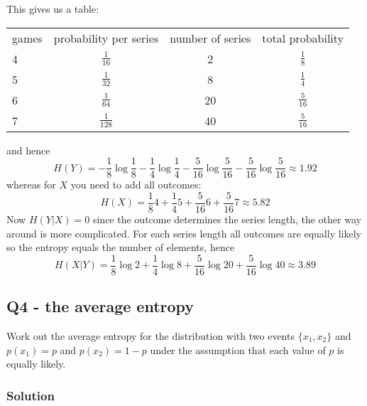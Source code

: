 \documentclass[12pt]{article}
\begin{document}
This gives us a table:
\begin{center}
  \begin{tabular}{l|ccc}
games&probability per series&number of series&total probability\\[7pt]
4& $\frac{1}{16}$  &2& $\frac{1}{8}$ \\[7pt]
5& $\frac{1}{32}$  &8& $\frac{1}{4}$ \\[7pt]
6& $\frac{1}{64}$  &20&$\frac{5}{16}$\\[7pt]
7& $\frac{1}{128}$ &40&$\frac{5}{16}$
  \end{tabular}
\end{center}
and hence
\begin{equation}
  H(Y)=-\frac{1}{8}\log{\frac{1}{8}}-\frac{1}{4}\log{\frac{1}{4}}-\frac{5}{16}\log{\frac{5}{16}}-\frac{5}{16}\log{\frac{5}{16}}\approx 1.92
\end{equation}
whereas for $X$ you need to add all outcomes: 
\begin{equation}
  H(X)=\frac{1}{8}4+\frac{1}{4}5+\frac{5}{16}6+\frac{5}{16}7\approx 5.82
\end{equation}
Now $H(Y|X)=0$ since the outcome determines the series length, the
other way around is more complicated. For each series length all
outcomes are equally likely so the entropy equals the number of elements, hence
\begin{equation}
  H(X|Y)=\frac{1}{8}\log{2}+\frac{1}{4}\log{8}+\frac{5}{16}\log{20}+\frac{5}{16}\log{40}\approx 3.89
\end{equation}

\subsection*{Q4 - the average entropy}

Work out the average entropy for the distribution with two events
$\{x_1,x_2\}$ and $p(x_1)=p$ and $p(x_2)=1-p$ under the assumption
that each value of $p$ is equally likely.

\subsubsection*{Solution}
\end{document}
